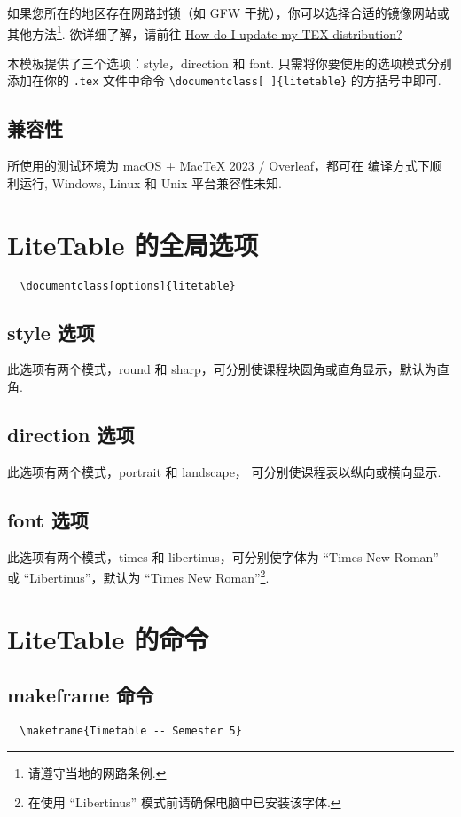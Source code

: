 \documentclass[11pt]{article}
\def\pkg#1{\texorpdfstring{\textcolor{pkgcolor}{\textsf{#1}}}{“#1”}}
\def\mode#1{\texorpdfstring{\textcolor{moducolor}{\textsf{#1}}}{“#1”}}
\def\cmd#1{\texorpdfstring{\textcolor{cmdcolor}{\textsf{#1}}}{“#1”}}
\begin{document}
如果您所在的地区存在网路封锁（如 GFW 干扰），你可以选择合适的镜像网站或其他方法\footnote{请遵守当地的网路条例.}. 欲详细了解，请前往 \href{https://tex.stackexchange.com/questions/55437/how-do-i-update-my-tex-distribution}{How do I update my TEX distribution?}

本模板提供了三个选项：\mode{style}，\mode{direction} 和 \mode{font}. 只需将你要使用的选项模式分别添加在你的 \verb|.tex| 文件中命令 \verb|\documentclass[ ]{litetable}| 的方括号中即可.

\subsection{兼容性}
所使用的测试环境为 macOS + MacTeX 2023 / Overleaf，都可在 \XeLaTeX{} 编译方式下顺利运行, Windows, Linux 和 Unix 平台兼容性未知.

\section{\pkg{LiteTable} 的全局选项}
\begin{verbatim}
  \documentclass[options]{litetable}
\end{verbatim}

\subsection{\mode{style} 选项}
此选项有两个模式，\mode{round} 和 \mode{sharp}，可分别使课程块圆角或直角显示，默认为直角.

\subsection{\mode{direction} 选项}
此选项有两个模式，\mode{portrait} 和 \mode{landscape}， 可分别使课程表以纵向或横向显示.

\subsection{\mode{font} 选项}
此选项有两个模式，\mode{times} 和 \mode{libertinus}，可分别使字体为 ``Times New Roman'' 或 ``Libertinus''，默认为 ``Times New Roman''\footnote{在使用 ``Libertinus'' 模式前请确保电脑中已安装该字体.}.

\section{\pkg{LiteTable} 的命令}

\subsection{\cmd{makeframe} 命令}
\begin{verbatim}
  \makeframe{Timetable -- Semester 5}
\end{verbatim}
\end{document}
